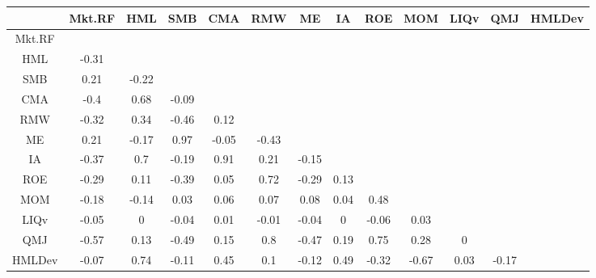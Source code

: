 \begin{tabular}{ccccccccccccc}
  \hline
 & Mkt.RF & HML & SMB & CMA & RMW & ME & IA & ROE & MOM & LIQv & QMJ & HMLDev \\ 
  \hline
Mkt.RF &  &  &  &  &  &  &  &  &  &  &  &  \\ 
  HML & -0.31 &  &  &  &  &  &  &  &  &  &  &  \\ 
  SMB & 0.21 & -0.22 &  &  &  &  &  &  &  &  &  &  \\ 
  CMA & -0.4 & 0.68 & -0.09 &  &  &  &  &  &  &  &  &  \\ 
  RMW & -0.32 & 0.34 & -0.46 & 0.12 &  &  &  &  &  &  &  &  \\ 
  ME & 0.21 & -0.17 & 0.97 & -0.05 & -0.43 &  &  &  &  &  &  &  \\ 
  IA & -0.37 & 0.7 & -0.19 & 0.91 & 0.21 & -0.15 &  &  &  &  &  &  \\ 
  ROE & -0.29 & 0.11 & -0.39 & 0.05 & 0.72 & -0.29 & 0.13 &  &  &  &  &  \\ 
  MOM & -0.18 & -0.14 & 0.03 & 0.06 & 0.07 & 0.08 & 0.04 & 0.48 &  &  &  &  \\ 
  LIQv & -0.05 & 0 & -0.04 & 0.01 & -0.01 & -0.04 & 0 & -0.06 & 0.03 &  &  &  \\ 
  QMJ & -0.57 & 0.13 & -0.49 & 0.15 & 0.8 & -0.47 & 0.19 & 0.75 & 0.28 & 0 &  &  \\ 
  HMLDev & -0.07 & 0.74 & -0.11 & 0.45 & 0.1 & -0.12 & 0.49 & -0.32 & -0.67 & 0.03 & -0.17 &  \\ 
   \hline
\end{tabular}
